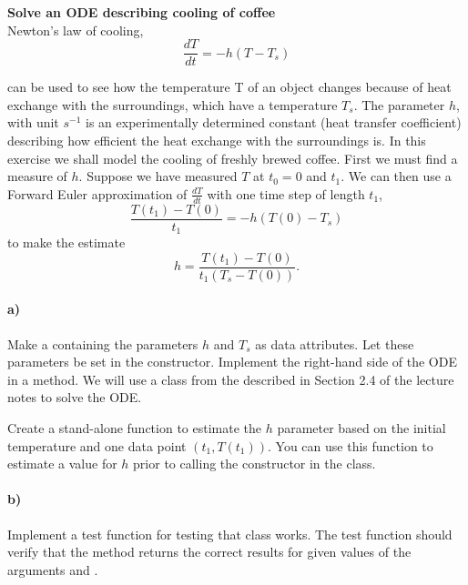\begin{Problem}{\textbf{Solve an ODE describing cooling of coffee}}\\
\noindent
Newton's law of cooling,
\begin{equation*}
  \frac{dT}{dt} = -h(T-T_s)
\end{equation*}

can be used to see how the temperature T of an object changes because of heat
exchange with the surroundings, which have a temperature $T_s$. The
parameter $h$, with unit $s^{-1}$ is an experimentally determined constant
(heat transfer coefficient) describing how efficient the heat exchange with
the surroundings is. In this exercise we shall model the cooling of freshly
brewed coffee. First we must find a measure of $h$. Suppose we have measured
$T$ at $t_0=0$ and $t_1$. We can then use a Forward Euler approximation
of $\frac{dT}{dt}$ with one time step of length $t_1$,
\begin{equation*}
   \frac{T(t_1)-T(0)}{t_1} = -h(T(0)-T_s)
\end{equation*}
to make the estimate
\begin{equation*}
   h = \frac{T(t_1)-T(0)}{t_1(T_s-T(0))}.
\end{equation*}

\paragraph{a)}
Make a  containing the
parameters $h$ and $T_s$ as data attributes. Let these parameters
be set in the constructor. Implement the right-hand side of the
ODE in a  method. We will use a
class from the  described in Section 2.4 of the
lecture notes to solve the ODE.

Create a stand-alone function  to
estimate the $h$ parameter based on the initial temperature and one data
point $(t_1, T(t_1))$. You can use this function to estimate a value
for $h$ prior to calling the constructor in the  class.

\paragraph{b)}
Implement a test function  for testing
that class  works. The test function should verify that the
 method returns the correct results for given values
of the arguments  and .


\end{Problem}
